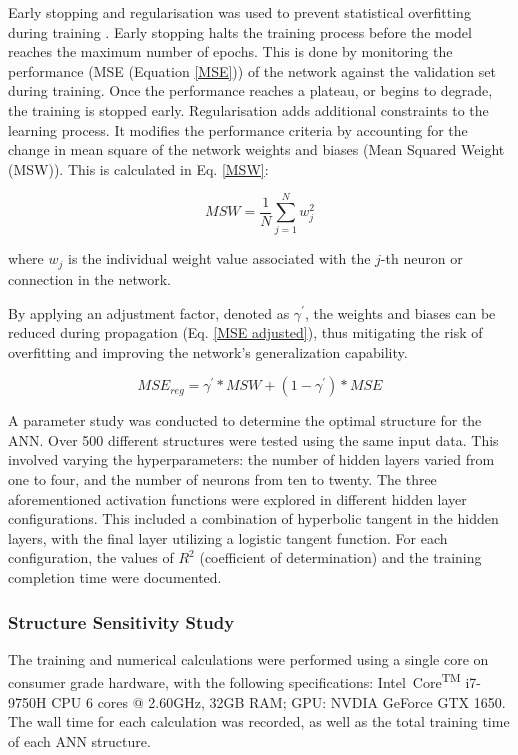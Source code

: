Early stopping and regularisation was used to prevent statistical overfitting during training \cite{MatlabOverfit}. Early stopping halts the training process before the model reaches the maximum number of epochs. This is done by monitoring the performance (MSE (Equation \ref{MSE})) of the network against the validation set during training. Once the performance reaches a plateau, or begins to degrade, the training is stopped early. Regularisation adds additional constraints to the learning process. It modifies the performance criteria by accounting for the change in mean square of the network weights and biases (Mean Squared Weight (MSW)). This is calculated in Eq. \ref{MSW}: 

\begin{equation}\label{MSW}
	M S W=\frac{1}{N} \sum_{j=1}^N w_j^2
\end{equation}

where $w_j$ is the individual weight value associated with the $j$-th neuron or connection in the network.

By applying an adjustment factor, denoted as $\gamma^{\prime}$, the weights and biases can be reduced during propagation (Eq. \ref{MSE adjusted}), thus mitigating the risk of overfitting and improving the network's generalization capability.

\begin{equation}\label{MSE adjusted}
	M S E_{r e g}=\gamma^{\prime} * M S W+\left(1-\gamma^{\prime}\right) * M S E
\end{equation}

A parameter study was conducted to determine the optimal structure for the ANN. Over 500 different structures were tested using the same input data. This involved varying the hyperparameters: the number of hidden layers varied from one to four, and the number of neurons from ten to twenty. The three aforementioned activation functions were explored in different hidden layer configurations. This included a combination of hyperbolic tangent in the hidden layers, with the final layer utilizing a logistic tangent function. For each configuration, the values of $R^2$ (coefficient of determination) and the training completion time were documented.

\subsubsection{Structure Sensitivity Study}


The training and numerical calculations were performed using a single core on consumer grade hardware, with the following specifications: Intel\textregistered\ Core\textsuperscript{TM} i7-9750H CPU 6 cores @ 2.60GHz, 32GB RAM; GPU: NVDIA GeForce GTX 1650. The wall time for each calculation was recorded, as well as the total training time of each ANN structure.


